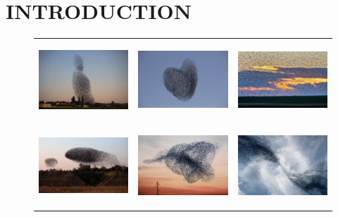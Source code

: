 \section{INTRODUCTION}
%
\begin{figure}[tb!]
	\centering
	\begin{tabular}{ccc} 
		\includegraphics[height=8em,width=10em]{figures/migrating_starlings.jpg} 
		&
		\includegraphics[height=8em,width=10em]{figures/roosting.jpg} 
		& 
		\includegraphics[height=8em,width=10em]{figures/starlings_fly.jpg} 
		 \\	
		\includegraphics[height=8em,width=10em]{figures/starlings_split.jpg}
		&
		\includegraphics[height=8em,width=10em]{figures/starlings_tube.jpg} 
		&
		\includegraphics[height=8em,width=10em]{figures/starlings_funnel.jpg}

\end{tabular}
\end{figure}
